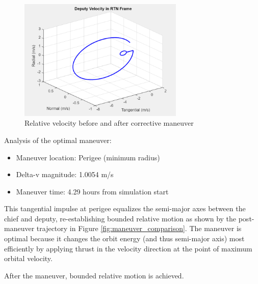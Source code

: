 \begin{figure}[H]
    \centering
    \includegraphics[width=0.7\textwidth]{PS2/Figures/Screenshot 2025-04-16 231937.png}
    \caption{Relative velocity before and after corrective maneuver}
    \label{fig:maneuver_comparison2}
\end{figure}

Analysis of the optimal maneuver:
\begin{itemize}
    \item Maneuver location: Perigee (minimum radius)
    \item Delta-v magnitude: 1.0054 m/s
    \item Maneuver time: 4.29 hours from simulation start
\end{itemize}

This tangential impulse at perigee equalizes the semi-major axes between the chief and deputy, re-establishing bounded relative motion as shown by the post-maneuver trajectory in Figure \ref{fig:maneuver_comparison}. The maneuver is optimal because it changes the orbit energy (and thus semi-major axis) most efficiently by applying thrust in the velocity direction at the point of maximum orbital velocity.

After the maneuver, bounded relative motion is achieved.